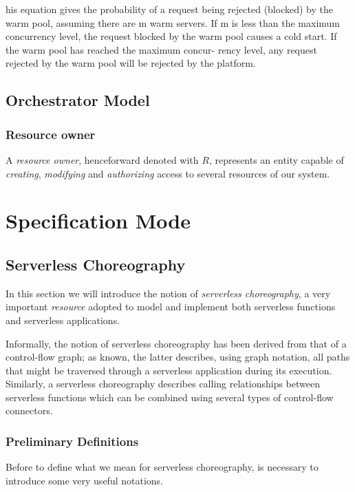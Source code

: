 \documentclass[10pt,a4paper]{report}
\theoremstyle{definition}
\begin{document}
his equation gives the probability of a request being
rejected (blocked) by the warm pool, assuming there are m
warm servers. If m is less than the maximum concurrency
level, the request blocked by the warm pool causes a cold
start. If the warm pool has reached the maximum concur-
rency level, any request rejected by the warm pool will be
rejected by the platform.



\section{Orchestrator Model}

\subsection{Resource owner}

A \textit{resource owner}, henceforward denoted with $R$, represents an entity capable of \textit{creating}, \textit{modifying} and \textit{authorizing} access to several resources of our system.

\newpage

\chapter{Specification Mode}
\section{Serverless Choreography}

In this section we will introduce the notion of \textit{serverless choreography}, a very important \textit{resource} adopted to model and implement both serverless functions and serverless applications.

Informally, the notion of serverless choreography has been derived from that of a control-flow graph; as known, the latter describes, using graph notation, all paths that might be traversed through a serverless application during its execution. Similarly, a serverless choreography describes calling relationships between serverless functions which can be combined using several types of control-flow connectors.

\subsection{Preliminary Definitions}

Before to define what we mean for serverless choreography, is necessary to introduce some very useful notations.
\end{document}

